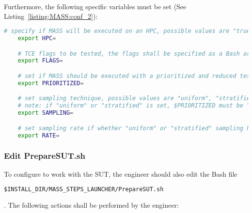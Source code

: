 Furthermore, the following specific \MASS variables must be set (See Listing~\ref{listing:MASS:conf_2}):

\begin{lstlisting}[language=bash, label=listing:MASS:conf_2, caption=\MASS specific variables. Excerpt of mass\_conf.sh file.]
	# specify if MASS will be executed on an HPC, possible values are "true" or "false"
	export HPC=

	# TCE flags to be tested, the flags shall be specified as a Bash array, e.g., ("-O0" "-O1").
	export FLAGS=

	# set if MASS should be executed with a prioritized and reduced test suite, possible values are "true" or "false"
	export PRIORITIZED=

	# set sampling technique, possible values are "uniform", "stratified", and "fsci"
	# note: if "uniform" or "stratified" is set, $PRIORITIZED must be "false"
	export SAMPLING=

	# set sampling rate if whether "uniform" or "stratified" sampling has been selected
	export RATE=
\end{lstlisting}

\subsubsection{Edit PrepareSUT.sh}


To configure \MASS to work with the SUT, the engineer should also edit the Bash file \\\begin{small}\texttt{\$INSTALL\_DIR/MASS\_STEPS\_LAUNCHER/PrepareSUT.sh}\end{small}. The following actions shall be performed by the engineer:

